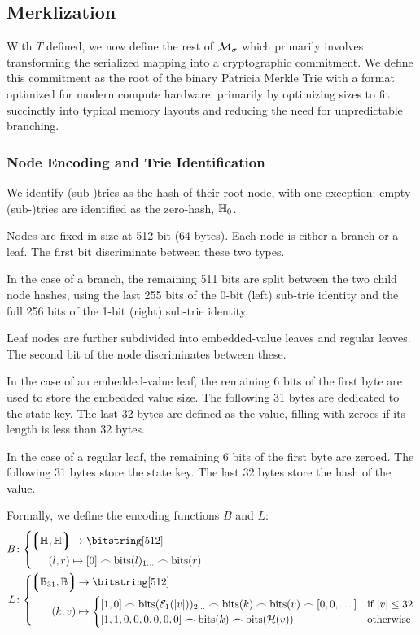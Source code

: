 \subsection{Merklization}

With $T$ defined, we now define the rest of $\mathcal{M}_\sigma$ which primarily involves transforming the serialized mapping into a cryptographic commitment. We define this commitment as the root of the binary Patricia Merkle Trie with a format optimized for modern compute hardware, primarily by optimizing sizes to fit succinctly into typical memory layouts and reducing the need for unpredictable branching.

\subsubsection{Node Encoding and Trie Identification}
We identify (sub-)tries as the hash of their root node, with one exception: empty (sub-)tries are identified as the zero-hash, $\mathbb{H}_{0}$.

Nodes are fixed in size at 512 bit (64 bytes). Each node is either a branch or a leaf. The first bit discriminate between these two types.

In the case of a branch, the remaining 511 bits are split between the two child node hashes, using the last 255 bits of the 0-bit (left) sub-trie identity and the full 256 bits of the 1-bit (right) sub-trie identity.

Leaf nodes are further subdivided into embedded-value leaves and regular leaves. The second bit of the node discriminates between these.

In the case of an embedded-value leaf, the remaining 6 bits of the first byte are used to store the embedded value size. The following 31 bytes are dedicated to the state key. The last 32 bytes are defined as the value, filling with zeroes if its length is less than 32 bytes.

In the case of a regular leaf, the remaining 6 bits of the first byte are zeroed. The following 31 bytes store the state key. The last 32 bytes store the hash of the value.

Formally, we define the encoding functions $B$ and $L$:
\begin{align}
  B&\colon\abracegroup{
    \tuple{\hash, \hash} &\to \bitstring[512]\\
    \tup{l, r} &\mapsto \sq{0} \concat \text{bits}(l)\interval{1}{} \concat \text{bits}(r)
  }\\
  L&\colon\abracegroup{
    \tuple{\blob[31], \blob} &\to \bitstring[512]\\
    \tup{k, v} &\mapsto \begin{cases}
      \sq{1, 0} \concat \text{bits}(\encode[1]{\len{v}})\interval{2}{} \concat \text{bits}(k) \concat \text{bits}(v) \concat \sq{0, 0, \dots} &\when \len{v} \le 32\\
      \sq{1, 1, 0, 0, 0, 0, 0, 0} \concat \text{bits}(k) \concat \text{bits}(\blake{v}) &\otherwise
    \end{cases}
  }
\end{align}

